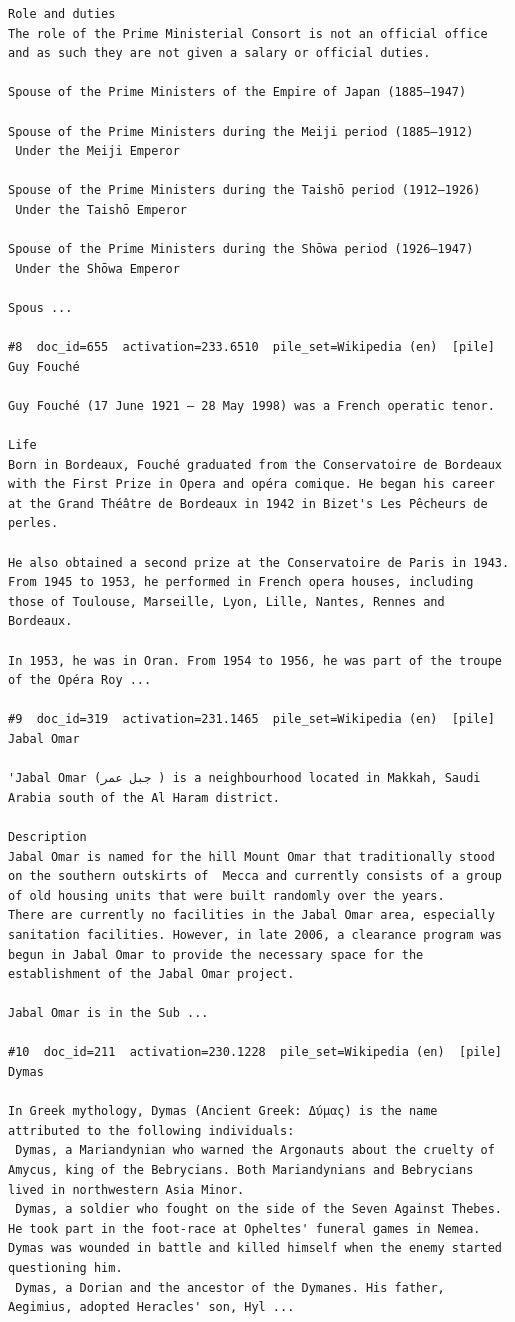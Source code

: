 \begin{verbatim}
Role and duties
The role of the Prime Ministerial Consort is not an official office and as such they are not given a salary or official duties.

Spouse of the Prime Ministers of the Empire of Japan (1885–1947)

Spouse of the Prime Ministers during the Meiji period (1885–1912)
 Under the Meiji Emperor

Spouse of the Prime Ministers during the Taishō period (1912–1926)
 Under the Taishō Emperor

Spouse of the Prime Ministers during the Shōwa period (1926–1947)
 Under the Shōwa Emperor

Spous ...

#8  doc_id=655  activation=233.6510  pile_set=Wikipedia (en)  [pile]
Guy Fouché

Guy Fouché (17 June 1921 – 28 May 1998) was a French operatic tenor.

Life 
Born in Bordeaux, Fouché graduated from the Conservatoire de Bordeaux with the First Prize in Opera and opéra comique. He began his career at the Grand Théâtre de Bordeaux in 1942 in Bizet's Les Pêcheurs de perles.

He also obtained a second prize at the Conservatoire de Paris in 1943. From 1945 to 1953, he performed in French opera houses, including those of Toulouse, Marseille, Lyon, Lille, Nantes, Rennes and Bordeaux.

In 1953, he was in Oran. From 1954 to 1956, he was part of the troupe of the Opéra Roy ...

#9  doc_id=319  activation=231.1465  pile_set=Wikipedia (en)  [pile]
Jabal Omar

'Jabal Omar (جبل عمر ) is a neighbourhood located in Makkah, Saudi Arabia south of the Al Haram district.

Description 
Jabal Omar is named for the hill Mount Omar that traditionally stood on the southern outskirts of  Mecca and currently consists of a group of old housing units that were built randomly over the years. 
There are currently no facilities in the Jabal Omar area, especially sanitation facilities. However, in late 2006, a clearance program was begun in Jabal Omar to provide the necessary space for the establishment of the Jabal Omar project. 

Jabal Omar is in the Sub ...

#10  doc_id=211  activation=230.1228  pile_set=Wikipedia (en)  [pile]
Dymas

In Greek mythology, Dymas (Ancient Greek: Δύμας) is the name attributed to the following individuals:
 Dymas, a Mariandynian who warned the Argonauts about the cruelty of Amycus, king of the Bebrycians. Both Mariandynians and Bebrycians lived in northwestern Asia Minor.
 Dymas, a soldier who fought on the side of the Seven Against Thebes. He took part in the foot-race at Opheltes' funeral games in Nemea. Dymas was wounded in battle and killed himself when the enemy started questioning him.
 Dymas, a Dorian and the ancestor of the Dymanes. His father, Aegimius, adopted Heracles' son, Hyl ...


\end{verbatim}
